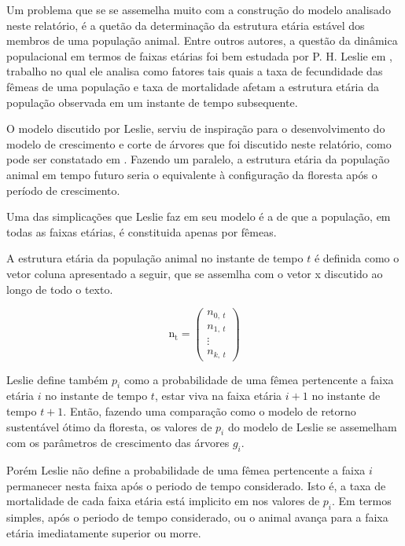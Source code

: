 \documentclass[a4paper, 12pt]{article}
\begin{document}
Um problema que se se assemelha muito com a construção do modelo analisado neste relatório, é a quetão da determinação da estrutura etária estável dos membros de uma população animal. Entre outros autores, a questão da dinâmica populacional em termos de faixas etárias foi bem estudada por P. H. Leslie em \citep{leslie_1945}, trabalho no qual ele analisa como fatores tais quais a taxa de fecundidade das fêmeas de uma população e taxa de mortalidade afetam a estrutura etária da população observada em um instante de tempo subsequente.

O modelo discutido por Leslie, serviu de inspiração  para o desenvolvimento do modelo de crescimento e corte de árvores que foi discutido neste relatório, como pode ser constatado em \cite{usher_1966}. Fazendo um paralelo, a estrutura etária da população animal em tempo futuro seria o equivalente à configuração da floresta após o período de crescimento.

Uma das simplicações que Leslie faz em seu modelo é a de que a população, em todas as faixas etárias, é constituida apenas por fêmeas. 

A estrutura etária da população animal no instante de tempo $t$ é definida como o vetor coluna apresentado a seguir, que se assemlha com o vetor x discutido ao longo de todo o texto.

\begin{equation}\label{vetor_n_leslie}
    \mathrm{n_t=}\begin{pmatrix}
n_{0{,}\ t}\\
n_{1{,}\ t}\\
\vdots \\
n_{k{,}\ t}
\end{pmatrix}
\end{equation}

Leslie define também $p_i$ como a probabilidade de uma fêmea pertencente a faixa etária $i$ no instante de tempo $t$, estar viva na faixa etária $i+1$ no instante de tempo $t+1$. Então, fazendo uma comparação como o modelo de retorno sustentável ótimo da floresta, os valores de $p_i$ do modelo de Leslie se assemelham com os parâmetros de crescimento das árvores $g_i$. 

Porém Leslie não define a probabilidade de uma fêmea pertencente a faixa $i$ permanecer nesta faixa após o periodo de tempo considerado. Isto é, a taxa de mortalidade de cada faixa etária está implicito em nos valores de $p_i$. Em termos simples, após o periodo de tempo considerado, ou o animal avança para a faixa etária imediatamente superior ou morre.
\end{document}
